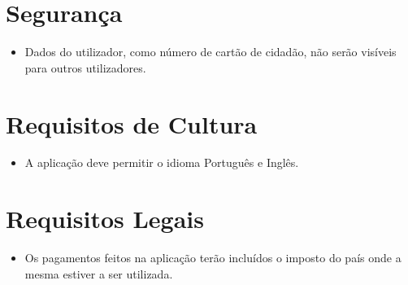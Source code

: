 \section{Segurança}
\begin{itemize}
    \item Dados do utilizador, como número de cartão de cidadão, não serão visíveis para outros utilizadores.
\end{itemize}{}

\section{Requisitos de Cultura}
\begin{itemize}
    \item A aplicação deve permitir o idioma Português e Inglês.
\end{itemize}{}

\section{Requisitos Legais}
\begin{itemize}
    \item Os pagamentos feitos na aplicação terão incluídos o imposto do país onde a mesma estiver a ser utilizada.
\end{itemize}{}







